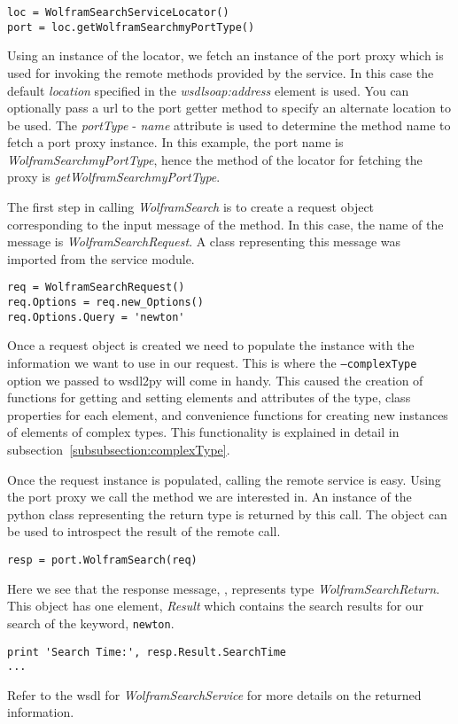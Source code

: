 \begin{verbatim}
loc = WolframSearchServiceLocator()
port = loc.getWolframSearchmyPortType()
\end{verbatim}

Using an instance of the locator, we fetch an instance of the port proxy
which is used for invoking the remote methods provided by the service.  In
this case the default {\it location} specified in the {\it wsdlsoap:address}
element is used.  You can optionally pass a url to the port getter method to
specify an alternate location to be used.  The {\it portType} - {\it name} 
attribute is used to determine the method name to fetch a port proxy instance.
In this example, the port name is {\it WolframSearchmyPortType}, hence the 
method of the locator for fetching the proxy is {\it getWolframSearchmyPortType}.

The first step in calling {\it WolframSearch} is to create a request object
corresponding to the input message of the method.  In this case, the name of
the message is {\it WolframSearchRequest}.  A class representing this message
was imported from the service module.

\begin{verbatim}
req = WolframSearchRequest()
req.Options = req.new_Options()
req.Options.Query = 'newton'
\end{verbatim}

Once a request object is created we need to populate the instance with the
information we want to use in our request.  This is where the {\tt --complexType}
option we passed to wsdl2py will come in handy.  This caused the creation of 
functions for getting and setting elements and attributes of the type, class 
properties for each element, and convenience functions for creating new instances
of elements of complex types.  This functionality is explained in detail in 
subsection~\ref{subsubsection:complexType}.

Once the request instance is populated, calling the remote service is easy.  Using
the port proxy we call the method we are interested in.  An instance of the python
class representing the return type is returned by this call.  The  object
can be used to introspect the result of the remote call.

\begin{verbatim}
resp = port.WolframSearch(req)
\end{verbatim}

Here we see that the response message, , represents type {\it WolframSearchReturn}.
This object has one element, {\it Result} which contains the search results for our
search of the keyword, {\tt newton}.

\begin{verbatim}
print 'Search Time:', resp.Result.SearchTime
...
\end{verbatim}

Refer to the wsdl for {\it WolframSearchService} for more details on the returned information.

